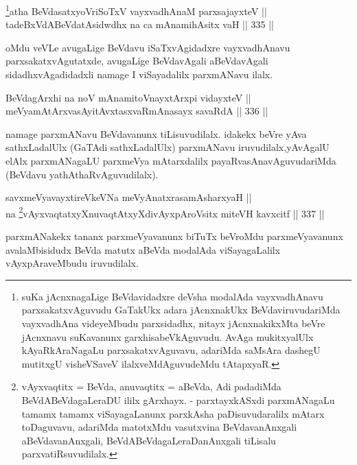 \begin{shl}
\footnote{suKa jAcnxnagaLige BeVdavidadxre deVsha modalAda vayxvadhAnavu parxsakatxvAguvudu GaTakUkx adara jAcnxnakUkx BeVdaviruvudariMda vayxvadhAna videyeMbudu parxsidadhx, nitayx jAcnxnakikxMta beVre jAcnxnavu suKavanunx garxhisabeVkAguvudu. AvAga mukitxyalUlx kAyaRkAraNagaLu parxsakatxvAguvavu, adariMda saMsAra dashegU mutitxgU visheVSaveV ilalxveMdAguvudeMdu tAtapxyaR.}atha BeVdasatxyoVriSoTxV vayxvadhAnaM parxsajayxteV || \\
tadeBxVdABeVdatAsidwdhx na ca mAnamihAsitx vaH \hfill || 335 ||  
\end{shl}

\begin{artha}
oMdu veVLe avugaLige BeVdavu iSaTxvAgidadxre vayxvadhAnavu
parxsakatxvAgutatxde, avugaLige BeVdavAgali aBeVdavAgali
sidadhxvAgadidadxli namage I viSayadalilx parxmANavu ilalx.
\end{artha}

\begin{shl}
BeVdagArxhi na noV mAnamitoV\s nayxtArxpi vidayxteV || \\
meVyamAtArxvasAyitAvxtasxvaRmAnasayx savaRdA \hfill || 336 ||  
\end{shl}

\begin{artha}
namage parxmANavu BeVdavanunx tiLisuvudilalx. idakekx beVre yAva
sathxLadalUlx (GaTAdi sathxLadalUlx) parxmANavu iruvudilalx,\break yAvAgalU
elAlx parxmANagaLU parxmeVya mAtarxdalilx payaRvasAnavAguvudariMda
(BeVdavu yathAthaRvAguvudilalx).
\end{artha}

\begin{shl}
savxmeVyavayxtireVkeVNa meVyAnatxrasamAsharxyaH || \\
na \footnote{vAyxvaqtitx = BeVda, anuvaqtitx = aBeVda, Adi padadiMda BeVdABeVdagaLeraDU ililx gArxhayx. - parxtayxkASxdi parxmANagaLu tamamx tamamx viSayagaLanunx parxkAsha paDisuvudaralilx mAtarx toDaguvavu, adariMda matotxMdu vasutxvina BeVdavanAnxgali aBeVdavanAnxgali, BeVdABeVdagaLeraDanAnxgali tiLisalu parxvatiRsuvudilalx.}vAyxvaqtatxyXnuvaqtAtxyXdivAyxpAroV\s sitx miteVH kavxcitf \hfill || 337 ||  
\end{shl}


\begin{artha}
parxmANakekx tananx parxmeVyavanunx biTuTx beVroMdu
parxmeVyavanunx avalaMbisidudx BeVda matutx aBeVda modalAda
viSayagaLalilx vAyxpAraveMbudu iruvudilalx.
\end{artha}

